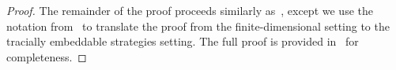 \begin{proof}

	
	The remainder of the proof proceeds similarly as~\cite[Section 8.4.3]{jiMIPRE2022a}, except we use the notation from~ to translate the proof from the finite-dimensional setting to the tracially embeddable strategies setting. The full proof is provided in~ for completeness. 
\end{proof}

